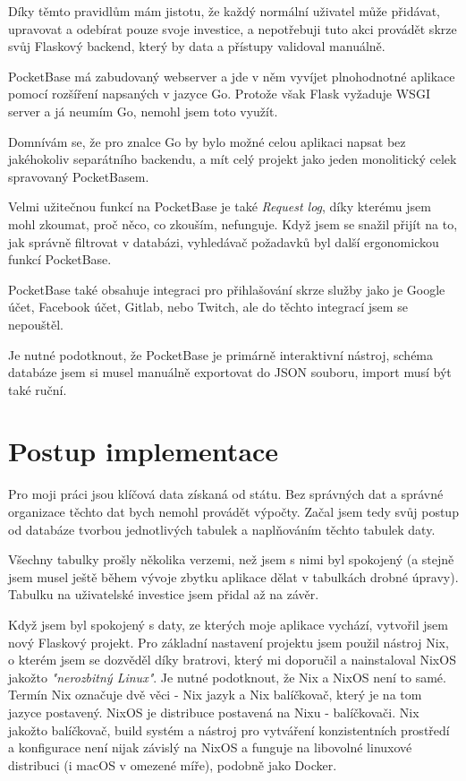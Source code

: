 \documentclass[11pt,a4paper,twoside,openright]{report}
\begin{document}
Díky těmto pravidlům mám jistotu, že každý normální uživatel může přidávat, upravovat a odebírat pouze svoje
investice, a nepotřebuji tuto akci provádět skrze svůj Flaskový backend, který by data a přístupy validoval
manuálně.

PocketBase má zabudovaný webserver a jde v něm vyvíjet plnohodnotné aplikace pomocí rozšíření napsaných
v jazyce Go. Protože však Flask vyžaduje WSGI server a já neumím Go, nemohl jsem toto využít.

Domnívám se, že pro znalce Go by bylo možné celou aplikaci napsat bez jakéhokoliv separátního backendu,
a mít celý projekt jako jeden monolitický celek spravovaný PocketBasem.

Velmi užitečnou funkcí na PocketBase je také \emph{Request log}, díky kterému jsem mohl zkoumat, proč
něco, co zkouším, nefunguje. Když jsem se snažil přijít na to, jak správně filtrovat v databázi, vyhledávač
požadavků byl další ergonomickou funkcí PocketBase.

PocketBase také obsahuje integraci pro přihlašování skrze služby jako je Google účet, Facebook účet,
Gitlab, nebo Twitch, ale do těchto integrací jsem se nepouštěl.

Je nutné podotknout, že PocketBase je primárně interaktivní nástroj, schéma databáze jsem si musel
manuálně exportovat do JSON souboru, import musí být také ruční.

\section{Postup implementace}

Pro moji práci jsou klíčová data získaná od státu. Bez správných dat a správné organizace těchto dat
bych nemohl provádět výpočty. Začal jsem tedy svůj postup od databáze tvorbou jednotlivých tabulek
a naplňováním těchto tabulek daty.

Všechny tabulky prošly několika verzemi, než jsem s nimi byl spokojený (a stejně jsem musel ještě
během vývoje zbytku aplikace dělat v tabulkách drobné úpravy). Tabulku na uživatelské investice
jsem přidal až na závěr.

Když jsem byl spokojený s daty, ze kterých moje aplikace vychází, vytvořil jsem nový Flaskový projekt.
Pro základní nastavení projektu jsem použil nástroj Nix, o kterém jsem se dozvěděl díky bratrovi, který
mi doporučil a nainstaloval NixOS jakožto \emph{"nerozbitný Linux"}. Je nutné podotknout, že Nix a NixOS
není to samé. Termín Nix označuje dvě věci - Nix jazyk a Nix balíčkovač, který je na tom jazyce postavený.
NixOS je distribuce postavená na Nixu - balíčkovači. Nix jakožto balíčkovač, build systém a nástroj pro
vytváření konzistentních prostředí a konfigurace není nijak závislý na NixOS a funguje na libovolné
linuxové distribuci (i macOS v omezené míře), podobně jako Docker.
\end{document}
